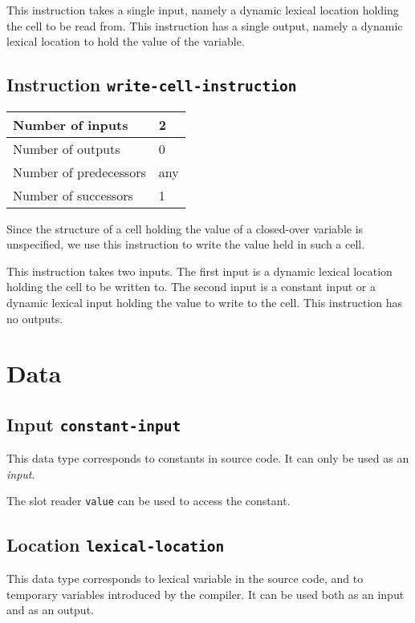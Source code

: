 This instruction takes a single input, namely a dynamic lexical
location holding the cell to be read from.  This instruction has a
single output, namely a dynamic lexical location to hold the value of
the variable.

\subsection{Instruction \texttt{write-cell-instruction}}
\label{hir-instruction-write-cell}

\begin{tabular}{|l|l|}
\hline
Number of inputs & 2\\
\hline
Number of outputs & 0\\
\hline
Number of predecessors & any\\
\hline
Number of successors & 1\\
\hline
\end{tabular}

Since the structure of a cell holding the value of a closed-over
variable is unspecified, we use this instruction to write the value
held in such a cell.

This instruction takes two inputs. The first input is a dynamic
lexical location holding the cell to be written to.  The second input
is a constant input or a dynamic lexical input holding the value to
write to the cell.  This instruction has no outputs.

\section{Data}

\subsection{Input \texttt{constant-input}}

This data type corresponds to constants in source code.  It can only
be used as an \emph{input}.

The slot reader \texttt{value} can be used to access the constant. 

\subsection{Location \texttt{lexical-location}}

This data type corresponds to lexical variable in the source code, and
to temporary variables introduced by the compiler.  It can be used
both as an input and as an output.

